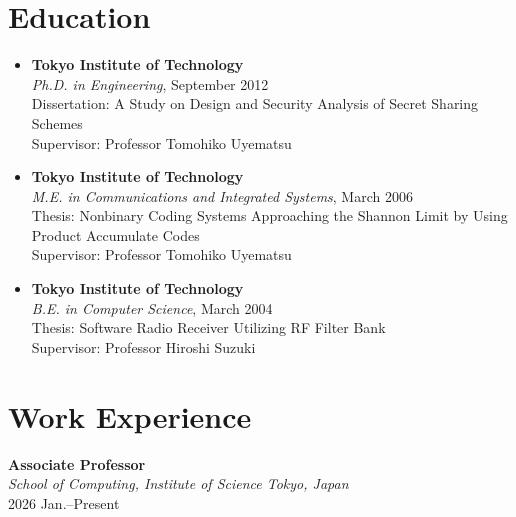 \section*{Education}

\begin{itemize}
  \item \textbf{Tokyo Institute of Technology}\\
    \hspace*{4ex}\textit{Ph.D. in Engineering}, September 2012\\
    \hspace*{4ex}Dissertation: A Study on Design and Security Analysis of Secret Sharing Schemes\\
    \hspace*{4ex}Supervisor: Professor Tomohiko Uyematsu

  \item \textbf{Tokyo Institute of Technology}\\
    \hspace*{4ex}\textit{M.E. in Communications and Integrated
    Systems}, March 2006\\
    \hspace*{4ex}Thesis: Nonbinary Coding Systems Approaching the Shannon Limit by Using Product Accumulate Codes\\
    \hspace*{4ex}Supervisor: Professor Tomohiko Uyematsu

  \item \textbf{Tokyo Institute of Technology}\\
    \hspace*{4ex}\textit{B.E. in Computer Science}, March 2004\\
    \hspace*{4ex}Thesis: Software Radio Receiver Utilizing RF Filter Bank\\
    \hspace*{4ex}Supervisor: Professor Hiroshi Suzuki
\end{itemize}


\section*{Work Experience}
\textbf{Associate Professor}\\
\hspace*{4ex}\textit{School of Computing, Institute of Science Tokyo, Japan}\\
\hspace*{4ex}2026 Jan.--Present

